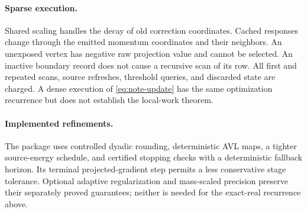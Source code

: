 \paragraph{Sparse execution.}
Shared scaling handles the decay of old correction coordinates. Cached
responses change through the emitted momentum coordinates and their neighbors.
An unexposed vertex has negative raw projection value and cannot be selected.
An inactive boundary record does not cause a recursive scan of its row.
All first and repeated scans, source refreshes, threshold queries, and discarded
state are charged. A dense execution of \eqref{eq:note-update} has the same
optimization recurrence but does not establish the local-work theorem.

\paragraph{Implemented refinements.}
The package uses controlled dyadic rounding, deterministic AVL maps, a tighter
source-energy schedule, and certified stopping checks with a deterministic
fallback horizon. Its terminal projected-gradient step permits a less
conservative stage tolerance. Optional adaptive regularization and mass-scaled
precision preserve their separately proved guarantees; neither is needed for
the exact-real recurrence above.
